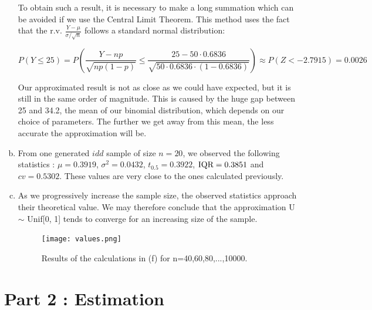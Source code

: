 \documentclass[a4paper]{article}
\begin{document}
\begin{enumerate}[(a)]
To obtain such a result, it is necessary to make a long summation which can be avoided if we use the Central Limit Theorem. This method uses the fact that the r.v. $\frac{Y-\mu}{\sigma / \sqrt{n}}$ follows a standard normal distribution:

$$P(Y \leq 25) = P\left ( \frac{Y-np}{\sqrt{np(1-p)}} \leq \frac{25-50\cdot0.6836}{\sqrt{50\cdot0.6836\cdot(1-0.6836)}} \right ) \approx P(Z < -2.7915) = 0.0026$$

Our approximated result is not as close as we could have expected, but it is still in the same order of magnitude. This is caused by the huge gap between 25 and 34.2, the mean of our binomial distribution, which depends on our choice of parameters. The further we get away from this mean, the less accurate the approximation will be.

\item From one generated $idd$ sample of size $n = 20$, we observed the following statistics : $\mu = 0.3919$, $\sigma^2 = 0.0432$, $t_0.5 = 0.3922$, $\textup{IQR} = 0.3851$ and $cv = 0.5302$.
These values are very close to the ones calculated previously.

\item As we progressively increase the sample size, the observed statistics approach their theoretical value. We may therefore conclude that the approximation U $\sim$ Unif[0, 1] tends to converge for an increasing size of the sample.

\begin{figure}
    \centering
  \texttt{[image: values.png]}
  \caption{Results of the calculations in (f) for n=40,60,80,...,10000.}
\end{figure}

\end{enumerate}


\newpage

\section{Part 2 : Estimation}
\end{document}
